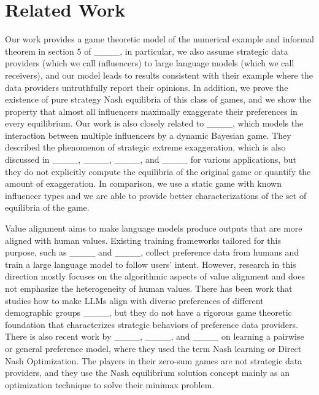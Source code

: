 \section{Related Work}

Our work provides a game theoretic model of the numerical example and informal theorem in section $5$ of ____, in particular, we also assume strategic data providers (which we call influencers) to large language models (which we call receivers), and our model leads to results consistent with their example where the data providers untruthfully report their opinions. In addition, we prove the existence of pure strategy Nash equilibria of this class of games, and we show the property that almost all influencers maximally exaggerate their preferences in every equilibrium. Our work is also closely related to ____, which models the interaction between multiple influencers by a dynamic Bayesian game. They described the phenomenon of strategic extreme exaggeration, which is also discussed in ____, ____, ____, and ____ for various applications, but they do not explicitly compute the equilibria of the original game or quantify the amount of exaggeration. In comparison, we use a static game with known influencer types and we are able to provide better characterizations of the set of equilibria of the game.

Value alignment aims to make language models produce outputs that are more aligned with human values. Existing training frameworks tailored for this purpose, such as ____ and ____, collect preference data from humans and train a large language model to follow users' intent. However, research in this direction mostly focuses on the algorithmic aspects of value alignment and does not emphasize the heterogeneity of human values. There has been work that studies how to make LLMs align with diverse preferences of different demographic groups ____, but they do not have a rigorous game theoretic foundation that characterizes strategic behaviors of preference data providers. There is also recent work by ____, ____, and ____ on learning a pairwise or general preference model, where they used the term Nash learning or Direct Nash Optimization. The players in their zero-sum games are not strategic data providers, and they use the Nash equilibrium solution concept mainly as an optimization technique to solve their minimax problem.

